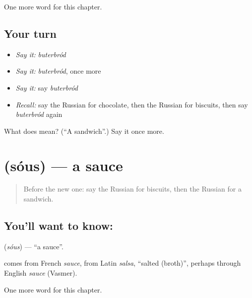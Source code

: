 \begin{grammarlens}[title={What you've built}]
One more word for this chapter.
\end{grammarlens}

\subsection*{Your turn}
\begin{itemize}
\raggedright
  \item \emph{Say it:} \emph{buterbród}
  \item \emph{Say it:} \emph{buterbród}, once more
  \item \emph{Say it:} say \emph{buterbród}
  \item \emph{Recall:} say the Russian for chocolate, then the Russian for biscuits, then say \emph{buterbród} again
\end{itemize}

\begin{tcolorbox}[breakable,colback=teal!4,colframe=teal!35!black,title={Before you move on}]
What does  mean? (\textquotedblleft{}A sandwich\textquotedblright{}.) Say it once more.
\end{tcolorbox}
\section[\texorpdfstring{\ru{соус} (sóus)}{соус (sóus)}]{ (sóus) — a sauce}

\label{lesson:RU-C105-sauce}



\begin{quote}
Before the new one: say the Russian for biscuits, then the Russian for a sandwich.
\end{quote}

\subsection*{You'll want to know: }
\textbf{} (\emph{sóus}) — \textquotedblleft{}a sauce\textquotedblright{}.

\begin{cousinweb}
\textbf{} comes from French \emph{sauce}, from Latin \emph{salsa}, \textquotedblleft{}salted (broth)\textquotedblright{}, perhaps through English \emph{sauce} (Vasmer).
\end{cousinweb}

\begin{grammarlens}[title={What you've built}]
One more word for this chapter.
\end{grammarlens}

